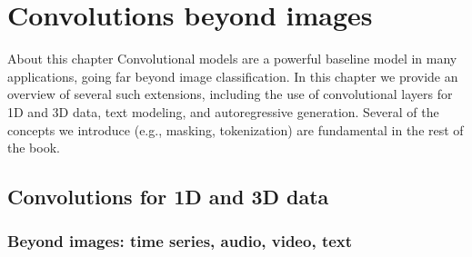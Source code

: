 \chapter{Convolutions beyond images}
\label{chap:convolutions_beyond_images}

\begin{supportbox}{About this chapter}
Convolutional models are a powerful baseline model in many applications, going far beyond image classification. In this chapter we provide an overview of several such extensions, including the use of convolutional layers for 1D and 3D data, text modeling, and autoregressive generation. Several of the concepts we introduce (e.g., masking, tokenization) are fundamental in the rest of the book.
\end{supportbox}

\section{Convolutions for 1D and 3D data}
\subsection{Beyond images: time series, audio, video, text}

